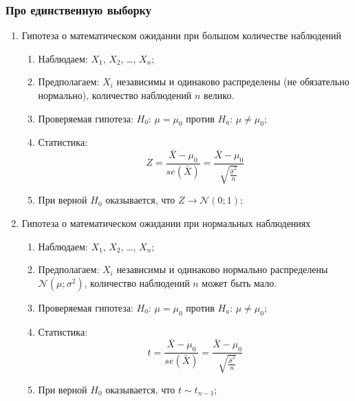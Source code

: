 \documentclass[12pt, a4paper]{article}
\def \cN{\mathcal{N}}
\begin{document}
\subsubsection{Про единственную выборку}

\begin{enumerate}

  \item Гипотеза о математическом ожидании при большом количестве наблюдений
    \begin{enumerate}

      \item Наблюдаем: $X_1$, $X_2$, \ldots, $X_n$;

      \item Предполагаем: $X_i$ независимы и одинаково распределены (не обязательно нормально), количество наблюдений $n$ велико.

      \item Проверяемая гипотеза: $H_0$: $\mu = \mu_0$ против $H_a$: $\mu \neq \mu_0$;

      \item Статистика:
	\[
	  Z = \frac{\bar X - \mu_0}{se(\bar X)} = \frac{\bar X - \mu_0}{\sqrt{\frac{\hat \sigma^2}{n}}}
	\]

      \item При верной $H_0$ оказывается, что $Z \to \cN(0;1)$;
    \end{enumerate}

  \item Гипотеза о математическом ожидании при нормальных наблюдениях
    \begin{enumerate}

      \item Наблюдаем: $X_1$, $X_2$, \ldots, $X_n$;

      \item Предполагаем: $X_i$ независимы и одинаково нормально распределены $\cN(\mu; \sigma^2)$, количество наблюдений $n$ может быть мало.

      \item Проверяемая гипотеза: $H_0$: $\mu = \mu_0$ против $H_a$: $\mu \neq \mu_0$;

      \item Статистика:
	\[
	  t = \frac{\bar X - \mu_0}{se(\bar X)} = \frac{\bar X - \mu_0}{\sqrt{\frac{\hat \sigma^2}{n}}}
	\]

      \item При верной $H_0$ оказывается, что $t \sim t_{n-1}$;
    \end{enumerate}



\end{enumerate}
\end{document}
